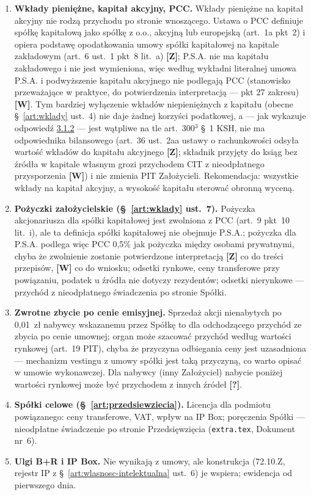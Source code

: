 \documentclass[12pt,a4paper]{report}
\newcommand{\Wiar}[1]{\textbf{[#1]}}
\begin{document}
\begin{enumerate}
  \item \textbf{Wkłady pieniężne, kapitał akcyjny, PCC.} Wkłady pieniężne na kapitał akcyjny nie rodzą przychodu po stronie wnoszącego. Ustawa o PCC definiuje spółkę kapitałową jako spółkę z o.o., akcyjną lub europejską (art.~1a pkt~2) i opiera podstawę opodatkowania umowy spółki kapitałowej na kapitale zakładowym (art.~6 ust.~1 pkt~8 lit.~a) \Wiar{Z}; P.S.A. nie ma kapitału zakładowego i nie jest wymieniona, więc według wykładni literalnej umowa P.S.A. i podwyższenie kapitału akcyjnego nie podlegają PCC (stanowisko przeważające w praktyce, do potwierdzenia interpretacją --- pkt 27 zakresu) \Wiar{W}. Tym bardziej wyłączenie wkładów niepieniężnych z kapitału (obecne §~\ref{art:wklady} ust.~4) nie daje żadnej korzyści podatkowej, a --- jak wykazuje odpowiedź \hyperref[memo:3.1.2]{3.1.2} --- jest wątpliwe na tle art.~300$^{3}$ §~1 KSH, nie ma odpowiednika bilansowego (art.~36 ust.~2aa ustawy o rachunkowości odsyła wartość wkładów do kapitału akcyjnego \Wiar{Z}; składnik przyjęty do ksiąg bez źródła w kapitale własnym grozi przychodem CIT z nieodpłatnego przysporzenia \Wiar{W}) i nie zmienia PIT Założycieli. Rekomendacja: wszystkie wkłady na kapitał akcyjny, a wysokość kapitału sterować obronną wyceną.
  \item \textbf{Pożyczki założycielskie (§~\ref{art:wklady} ust.~7).} Pożyczka akcjonariusza dla spółki kapitałowej jest zwolniona z PCC (art.~9 pkt~10 lit.~i), ale ta definicja spółki kapitałowej nie obejmuje P.S.A.; pożyczka dla P.S.A. podlega więc PCC 0,5\% jak pożyczka między osobami prywatnymi, chyba że zwolnienie zostanie potwierdzone interpretacją \Wiar{Z} co do treści przepisów, \Wiar{W} co do wniosku; odsetki rynkowe, ceny transferowe przy powiązaniu, podatek u źródła nie dotyczy rezydentów; odsetki nierynkowe --- przychód z nieodpłatnego świadczenia po stronie Spółki.
  \item \textbf{Zwrotne zbycie po cenie emisyjnej.} Sprzedaż akcji nienabytych po 0,01~zł nabywcy wskazanemu przez Spółkę to dla odchodzącego przychód ze zbycia po cenie umownej; organ może szacować przychód według wartości rynkowej (art.~19 PIT), chyba że przyczyna odbiegania ceny jest uzasadniona --- mechanizm vestingu z umowy spółki jest taką przyczyną, co warto opisać w umowie wykonawczej. Dla nabywcy (inny Założyciel) nabycie poniżej wartości rynkowej może być przychodem z innych źródeł \Wiar{?}.
  \item \textbf{Spółki celowe (§~\ref{art:przedsiewziecia}).} Licencja dla podmiotu powiązanego: ceny transferowe, VAT, wpływ na IP Box; poręczenia Spółki --- nieodpłatne świadczenie po stronie Przedsięwzięcia (\texttt{extra.tex}, Dokument nr~6).
  \item \textbf{Ulgi B+R i IP Box.} Nie wynikają z umowy, ale konstrukcja (72.10.Z, rejestr IP z §~\ref{art:wlasnosc-intelektualna} ust.~6) je wspiera; ewidencja od pierwszego dnia.
\end{enumerate}
\end{document}
